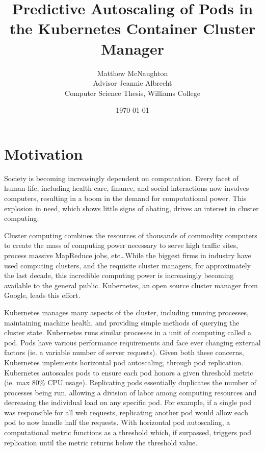 \documentclass[letterpaper,11pt,twocolumn]{article}
\begin{document}
\title{Predictive Autoscaling of Pods in the Kubernetes Container Cluster
Manager}
\date{\today}

\author{
  {\rm Matthew McNaughton}\\
  Advisor Jeannie Albrecht\\
  Computer Science Thesis, Williams College
}

\maketitle

\thispagestyle{empty}

\section{Motivation}
Society is becoming increasingly dependent on computation. Every facet of human life,
including health care, finance, and social interactions now involves computers,
resulting in a boom in the demand for computational power.
This explosion in need, which shows little signs of abating,
drives an interest in cluster computing.

Cluster computing combines the resources of thousands of
commodity computers to create the mass of computing power necessary to serve
high traffic sites, process massive MapReduce jobs, etc\dots While the biggest firms
in industry have used computing clusters,
and the requisite cluster managers, for approximately the last decade, this incredible
computing power is increasingly becoming available to the general public.
Kubernetes, an open source cluster manager from Google, leads this
effort.\cite{k8s-website}

Kubernetes manages many aspects of the cluster, including running processes,
maintaining machine health, and providing simple methods of querying the cluster
state. Kubernetes runs similar
processes in a unit of computing called a pod.
Pods have various performance requirements and face ever
changing external factors (ie. a variable number of server requests).
Given both these concerns, Kubernetes implements horizontal pod autoscaling, through pod
replication.\cite{k8s-horizontal-pod-autoscaler-proposal} Kubernetes
autoscales pods to ensure each pod honors a given threshold metric
(ie. max 80\% CPU usage). Replicating pods
essentially duplicates the number of processes being run, allowing a division
of labor among computing resources and decreasing the individual load on any
specific pod. For example, if a single pod was responsible for all web requests,
replicating another pod would allow each pod to now handle half the requests.
With horizontal pod autoscaling, a computational metric functions as a threshold
which, if surpassed, triggers pod replication until the metric returns below
the threshold value.
\end{document}
